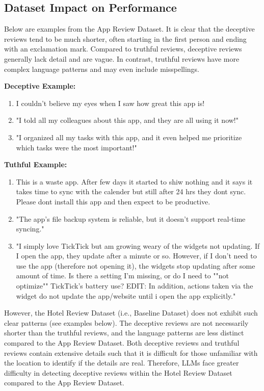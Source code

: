 \documentclass[sigconf, nonacm]{acmart}
\newenvironment{example}
{\begin{mdframed}[
    linecolor=exampleborder,
    linewidth=0.5pt,
    backgroundcolor=examplecolor,
    topline=false,
    bottomline=false,
    leftline=true,
    rightline=false,
    innertopmargin=2pt,
    innerbottommargin=2pt,
    innerleftmargin=5pt,
    innerrightmargin=5pt,
    skipabove=10pt,
    skipbelow=10pt
]}
{\end{mdframed}}
\theoremstyle{definition}
\begin{document}
\subsection{Dataset Impact on Performance}

Below are examples from the App Review Dataset. It is clear that the deceptive reviews tend to be much shorter, often starting in the first person and ending with an exclamation mark. Compared to truthful reviews, deceptive reviews generally lack detail and are vague. In contrast, truthful reviews have more complex language patterns and may even include misspellings.

\begin{example}
  \textbf{Deceptive Example:}
  \begin{enumerate}
    \item I couldn’t believe my eyes when I saw how great this app is!
    \item "I told all my colleagues about this app, and they are all using it now!"
    \item "I organized all my tasks with this app, and it even helped me prioritize which tasks were the most important!"
  \end{enumerate}
\end{example}

\begin{example}
  \textbf{Tuthful Example:}
  \begin{enumerate}
    \item This is a waste app. After few days it started to shiw nothing and it says it takes time to sync with the calender but still after 24 hrs they dont sync. Please dont install this app and then expect to be productive.
    \item "The app’s file backup system is reliable, but it doesn’t support real-time syncing."
    \item "I simply love TickTick but am growing weary of the widgets not updating. If I open the app, they update after a minute or so. However, if I don't need to use the app (therefore not opening it), the widgets stop updating after some amount of time. Is there a setting I'm missing, or do I need to ""not optimize"" TickTick's battery use? EDIT: In addition, actions taken via the widget do not update the app/website until i open the app explicitly."
  \end{enumerate}
\end{example}

However, the Hotel Review Dataset (i.e., Baseline Dataset) does not exhibit such clear patterns (see examples below). The deceptive reviews are not necessarily shorter than the truthful reviews, and the language patterns are less distinct compared to the App Review Dataset. Both deceptive reviews and truthful reviews contain extensive details such that it is difficult for those unfamiliar with the location to identify if the details are real. Therefore, LLMs face greater difficulty in detecting deceptive reviews within the Hotel Review Dataset compared to the App Review Dataset.
\end{document}
